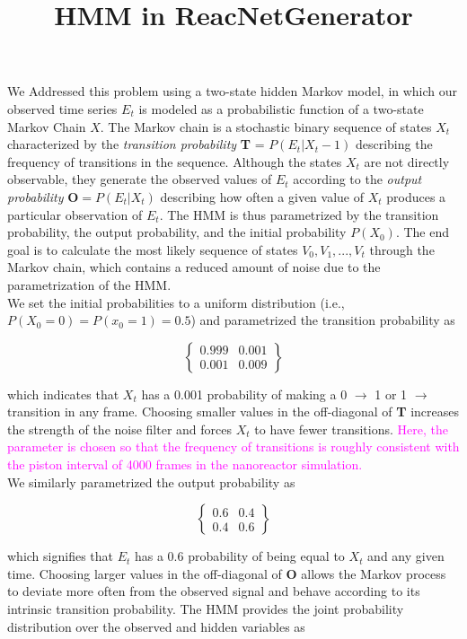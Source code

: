 \documentclass{article}
\title{HMM in ReacNetGenerator}
\begin{document}
\maketitle

We \cite{wlpjctc2016} Addressed this problem using a two-state hidden Markov model, in which our observed time series $E_t$ is modeled as a probabilistic function of a two-state Markov Chain $X$. The Markov chain is a stochastic binary sequence of states $X_t$ characterized by the \emph{transition probability} \textbf{T} = $P(E_t|X_t-1)$ describing the frequency of transitions in the sequence. Although the states $X_t$ are not directly observable, they generate the observed values of $E_t$ according to the \emph{output probability} $\mathbf{O} = P(E_t|X_t)$ describing how often a given value of $X_t$ produces a particular observation of $E_t$.
The HMM is thus parametrized by the transition probability, the output probability, and the initial probability $P(X_0)$. The end goal is to calculate the most likely sequence of states ${V_0, V_1, ..., V_t}$ through the Markov chain, which contains a reduced amount of noise due to the parametrization of the HMM. \\

We set the initial probabilities to a uniform distribution (i.e., $P(X_0 = 0) = P(x_0 = 1) = 0.5$) and parametrized the transition probability as 

$$
\begin{Bmatrix}
   0.999 & 0.001 \\ 
   0.001 & 0.009
\end{Bmatrix} 
$$

which indicates that $X_t$ has a 0.001 probability of making a 0 $\rightarrow$ 1 or 1 $\rightarrow$ transition in any frame. Choosing smaller values in the off-diagonal of \textbf{T} increases the strength of the noise filter and forces $X_t$ to have fewer transitions. \textcolor{magenta}{Here, the parameter is chosen so that the frequency of transitions is roughly consistent with the piston interval of 4000 frames in the nanoreactor simulation.} \\

We similarly parametrized the output probability as 

$$
\begin{Bmatrix}
    0.6 & 0.4 \\
    0.4 & 0.6
\end{Bmatrix}  
$$

which signifies that $E_t$ has a 0.6 probability of being equal to $X_t$ and any given time. Choosing larger values in the off-diagonal of \textbf{O} allows the Markov process to deviate more often from the observed signal and behave according to its intrinsic transition probability. The HMM provides the joint probability distribution over the observed and hidden variables as
\end{document}
